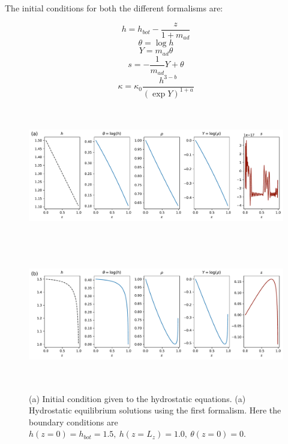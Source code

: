 \documentclass{aastex631}
\begin{document}
The initial conditions for both the different formalisms are:

\begin{equation}
    h = h_{bot} - \dfrac{z}{1+m_{ad}}
\end{equation}
\begin{equation}
    \theta = \log h
\end{equation}
\begin{equation}
    Y = m_{ad}\theta
\end{equation}
\begin{equation}
    s = -\dfrac{1}{m_{ad}}Y + \theta
\end{equation}
\begin{equation}
    \kappa = \kappa_{0}\dfrac{h^{3-b}}{(\exp{Y})^{1+a}}
\end{equation}

\begin{figure}
    \centering
    \includegraphics[width=\textwidth,height=6cm]{kramers_initial_condition_linear_nh0.5_eps-2.22e-16_gamma1.67.pdf} \\
    \includegraphics[width=\textwidth,height=6cm]{kramers_solve_h_linear_nh0.5_eps-2.22e-16_gamma1.67.pdf}
    \caption{(a) Initial condition given to the hydrostatic equations. (a) Hydrostatic equilibrium solutions using the first formalism. Here the boundary conditions are $h(z=0)=h_{bot}=1.5,~h(z=L_{z})=1.0,~\theta(z=0)=0$.}
    \label{fig:first_figure}
\end{figure}
\end{document}
